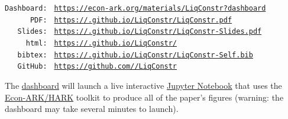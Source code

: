 \documentclass[titlepage,letterpaper]{\econtex}
\begin{document}
\vspace{-1cm}
\begin{authorsinfo}
\end{authorsinfo}

\hypertarget{links}{}
\medskip
\begin{small}
  \parbox{\textwidth}{
    \begin{center}
      \begin{tabbing}
        \texttt{Dashboard:~} \= \= \texttt{\href{https://econ-ark.org/materials/LiqConstr?dashboard}{https://econ-ark.org/materials/LiqConstr?dashboard}} \\
        \texttt{~~~~~~PDF:~} \> \> \texttt{\href{https://\owner.github.io/LiqConstr/LiqConstr.pdf}{https://\owner.github.io/LiqConstr/LiqConstr.pdf}} \\
        \texttt{~~~Slides:~} \> \> \texttt{\href{https://\owner.github.io/LiqConstr/LiqConstr-Slides.pdf}{https://\owner.github.io/LiqConstr/LiqConstr-Slides.pdf}} \\
        \texttt{~~~~~html:~} \> \> \texttt{\href{https://\owner.github.io/LiqConstr/}{https://\owner.github.io/LiqConstr/}}    \\
        \texttt{~~~bibtex:~} \> \> \texttt{\href{https://\owner.github.io/LiqConstr/LiqConstr-Self.bib}{https://\owner.github.io/LiqConstr/LiqConstr-Self.bib}}  \\
        \texttt{~~~GitHub:~} \> \> \texttt{\href{https://github.com/\owner/LiqConstr}{https://github.com/\owner/LiqConstr}} \\
      \end{tabbing}
    \end{center}

    The \href{https://econ-ark.org/materials/LiqConstr?dashboard}{dashboard} will launch a live interactive \href{https://en.wikipedia.org/wiki/Project\_Jupyter\#Jupyter_Notebook}{Jupyter Notebook} that uses the \href{https://econ-ark/HARK}{Econ-ARK/HARK} toolkit to produce all of the paper's figures (warning: the dashboard may take several minutes to launch).
  } %
\end{small}
\end{document}
